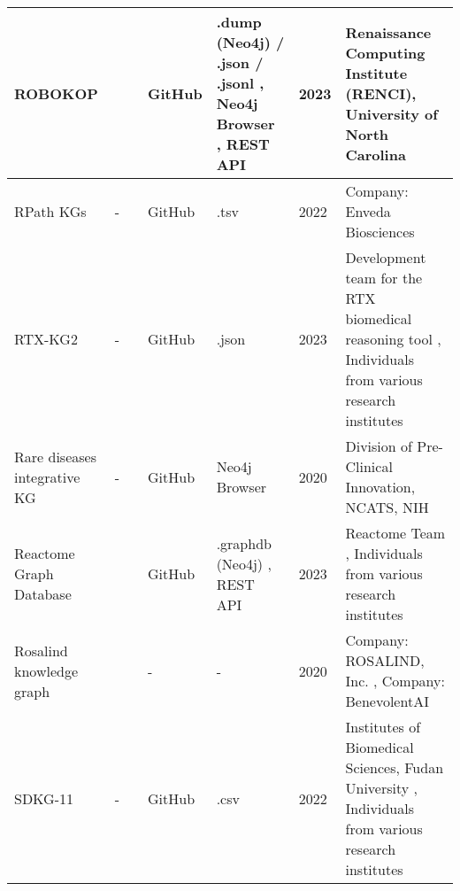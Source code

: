 \documentclass{article}
\begin{document}
\begin{landscape}
\begin{xltabular}{\textwidth}{p{3cm}|p{2.2cm}|p{2.2cm}|p{2.2cm}|p{2.2cm}|p{1cm}|p{6cm}}
\hline


\hline


ROBOKOP
&
\cite{robokop_website1}
\cite{robokop_website2}
&
\cite{robokop_publication1}
\cite{robokop_publication2}
&
GitHub
\cite{robokop_github}
&
.dump (Neo4j) / .json / .jsonl
\cite{robokop_data1},
Neo4j Browser
\cite{robokop_data2},
REST API
\cite{robokop_data3}
&
2023
&
Renaissance Computing Institute (RENCI), University of North Carolina
\cite{robokop_group}
\\


\hline


RPath KGs
&
-
&
\cite{rpath_publication}
&
GitHub
\cite{rpath_github}
&
.tsv
\cite{rpath_data1}
\cite{rpath_data2}
&
2022
&
Company: Enveda Biosciences
\cite{rpath_group}
\\


\hline


RTX-KG2
&
-
&
\cite{rtxkg2_publication}
&
GitHub
\cite{rtxkg2_github}
&
.json
\cite{rtxkg2_data1}
\cite{rtxkg2_data2}
&
2023
&
Development team for the RTX biomedical reasoning tool
\cite{rtxkg2_group},
Individuals from various research institutes
\\


\hline


Rare diseases integrative KG
&
-
&
\cite{rdikg_publication}
&
GitHub
\cite{rdikg_github}
&
Neo4j Browser
\cite{rdikg_data}
&
2020
&
Division of Pre-Clinical Innovation, NCATS, NIH
\cite{rdikg_group}
\\


\hline


Reactome Graph Database
&
\cite{reactome_website}
&
\cite{reactome_publication1}
\cite{reactome_publication2}
&
GitHub
\cite{reactome_github1}
\cite{reactome_github2}
&
.graphdb (Neo4j)
\cite{reactome_data1},
REST API
\cite{reactome_data2}
&
2023
&
Reactome Team
\cite{reactome_group},
Individuals from various research institutes
\\


\hline


Rosalind knowledge graph
&
\cite{rosalind_website}
&
\cite{rosalind_publication}
&
-
&
-
&
2020
&
Company: ROSALIND, Inc.
\cite{rosalind_group1},
Company: BenevolentAI
\cite{rosalind_group2}
\\


\hline


SDKG-11
&
-
&
\cite{sdkg11_publication}
&
GitHub
\cite{sdkg11_github}
&
.csv
\cite{sdkg11_data}
&
2022
&
Institutes of Biomedical Sciences, Fudan University
\cite{sdkg115_group},
Individuals from various research institutes
\\



\end{xltabular}
\end{landscape}
\end{document}

